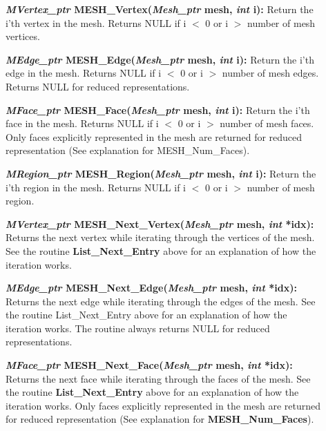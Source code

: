 \documentclass[12pt]{article}
\begin{document}
\begin{description}
\item[]

\item[]\textbf{\textit{MVertex\_ptr} MESH\_Vertex(\textit{Mesh\_ptr} mesh,
\textit{int} i):} Return the i'th vertex in the mesh. Returns NULL if i
$<$ 0 or i $>$ number of mesh vertices.

\item[]\textbf{\textit{MEdge\_ptr} MESH\_Edge(\textit{Mesh\_ptr} mesh,
\textit{int} i):} Return the i'th edge in the mesh. Returns NULL if i $<$
0 or i $>$ number of mesh edges. Returns NULL for reduced
representations.

\item[]\textbf{\textit{MFace\_ptr} MESH\_Face(\textit{Mesh\_ptr} mesh,
\textit{int} i):} Return the i'th face in the mesh. Returns NULL if i $<$
0 or i $>$ number of mesh faces. Only faces explicitly represented in
the mesh are returned for reduced representation (See explanation for
MESH\_Num\_Faces).

\item[]\textbf{\textit{MRegion\_ptr} MESH\_Region(\textit{Mesh\_ptr} mesh,
\textit{int} i):} Return the i'th region in the mesh. Returns NULL if i
$<$ 0 or i $>$ number of mesh region.

\item[]

\item[]\textbf{\textit{MVertex\_ptr} MESH\_Next\_Vertex(\textit{Mesh\_ptr}
mesh, \textit{int} *idx):} Returns the next vertex while iterating
through the vertices of the mesh. See the routine \textbf{List\_Next\_Entry}
above for an explanation of how the iteration works.

\item[]\textbf{\textit{MEdge\_ptr} MESH\_Next\_Edge(\textit{Mesh\_ptr} mesh,
\textit{int} *idx):} Returns the next edge while iterating through the
edges of the mesh. See the routine List\_Next\_Entry above for an
explanation of how the iteration works.  The routine always returns
NULL for reduced representations.

\item[]\textbf{\textit{MFace\_ptr} MESH\_Next\_Face(\textit{Mesh\_ptr} mesh,
\textit{int} *idx):} Returns the next face while iterating through the
faces of the mesh. See the routine \textbf{List\_Next\_Entry} above for
an explanation of how the iteration works.  Only faces explicitly
represented in the mesh are returned for reduced representation (See
explanation for \textbf{MESH\_Num\_Faces}).


\end{description}
\end{document}
